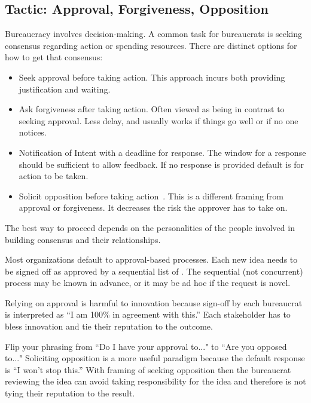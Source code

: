 \subsection*{Tactic: Approval, Forgiveness, Opposition\label{sec:approval-forgiveness-opposition}}

Bureaucracy involves  decision-making. 
A common task for bureaucrats is seeking consensus regarding action or spending resources. There are distinct options for how to get that consensus:
\begin{itemize}
    \item Seek approval before taking action. This approach incurs both providing justification and waiting.
    \item Ask forgiveness after taking action. Often viewed as being in contrast to seeking approval. Less delay, and usually works if things go well or if no one notices. 


    \item Notification of Intent with a deadline for response. The window for a response should be sufficient to  allow feedback. If no response is provided default is for action to be taken.
    \item Solicit opposition before taking action~\cite{2009_Perr}. This is a different framing from approval or forgiveness. It decreases the risk the approver has to take on.
\end{itemize}
The best way to proceed depends on the personalities of the people involved in building consensus and their relationships. 

Most organizations default to approval-based  processes. Each new idea needs to be signed off as approved by a sequential list of 
\iftoggle{glossarysubstitutionworks}{\glspl{bureaucrat}}{bureaucrats}. The sequential (not concurrent) process may be known in advance, or it may be ad hoc if the request is novel.

Relying on approval is harmful to innovation because sign-off by each bureaucrat is interpreted as ``I am 100\% in agreement with this.'' Each stakeholder has to bless innovation and tie their reputation to the outcome.

Flip your phrasing from ``Do I have your approval to..." to ``Are you opposed to..." 
Soliciting opposition is a more useful paradigm because the default response is ``I won't stop this.'' 
With framing of seeking opposition then the bureaucrat reviewing the idea can avoid taking responsibility for the idea and therefore is not tying their reputation to the result.

